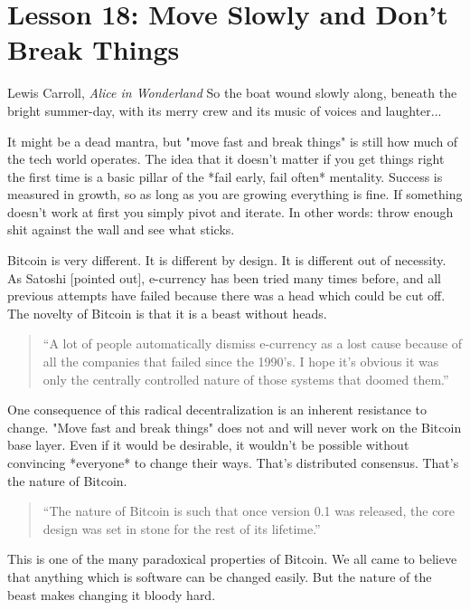 \chapter{Lesson 18: Move Slowly and Don't Break Things}
\label{les:18}

\begin{chapquote}{Lewis Carroll, \textit{Alice in Wonderland}}
So the boat wound slowly along, beneath the bright summer-day, with its merry crew and its music of voices and laughter...
\end{chapquote}

It might be a dead mantra, but "move fast and break things" is still how
much of the tech world operates. The idea that it doesn't matter if you
get things right the first time is a basic pillar of the *fail early,
fail often* mentality. Success is measured in growth, so as long as you
are growing everything is fine. If something doesn't work at first you
simply pivot and iterate. In other words: throw enough shit against the
wall and see what sticks.

Bitcoin is very different. It is different by design. It is different
out of necessity. As Satoshi [pointed out], e-currency has been tried
many times before, and all previous attempts have failed because there
was a head which could be cut off. The novelty of Bitcoin is that it is
a beast without heads.

\begin{quotation}
``A lot of people automatically dismiss e-currency as a lost cause
because of all the companies that failed since the 1990's. I hope it's
obvious it was only the centrally controlled nature of those systems
that doomed them.''
\end{quotation}

One consequence of this radical decentralization is an inherent
resistance to change. "Move fast and break things" does not and will
never work on the Bitcoin base layer. Even if it would be desirable, it
wouldn't be possible without convincing *everyone* to change their ways.
That's distributed consensus. That's the nature of Bitcoin.

\begin{quotation}
``The nature of Bitcoin is such that once version 0.1 was released, the
core design was set in stone for the rest of its lifetime.''
\end{quotation}

This is one of the many paradoxical properties of Bitcoin. We all came
to believe that anything which is software can be changed easily. But
the nature of the beast makes changing it bloody hard.

